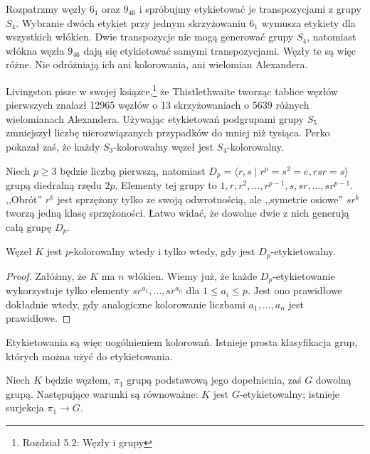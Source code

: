 Rozpatrzmy węzły $6_1$ oraz $9_{46}$ i spróbujmy etykietować je transpozycjami z grupy $S_4$.
Wybranie dwóch etykiet przy jednym skrzyżowaniu $6_1$ wymusza etykiety dla wszystkich włókien.
Dwie transpozycje nie mogą generować grupy $S_4$, natomiast włókna węzła $9_{46}$ dają się etykietować samymi transpozycjami.
Węzły te są więc różne.
Nie odróżniają ich ani kolorowania, ani wielomian Alexandera.

Livingston pisze w swojej książce,\footnote{Rozdział 5.2: Węzły i grupy} że Thistlethwaite tworząc tablice węzłów pierwszych znalazł 12965 węzłów o 13 skrzyżowaniach o 5639 różnych wielomianach Alexandera.
Używając etykietowań podgrupami grupy $S_5$ zmniejszył liczbę nierozwiązanych przypadków do mniej niż tysiąca.
Perko pokazał zaś, że każdy $S_3$-kolorowalny węzeł jest $S_4$-kolorowalny.

Niech $p \ge 3$ będzie liczbą pierwszą, natomiast $D_p = \langle r, s \mid r^p = s^2 = e, rsr = s \rangle$ grupą diedralną rzędu $2p$.
Elementy tej grupy to $1, r, r^2, \ldots, r^{p-1}, s, sr, \ldots, sr^{p-1}$.
,,Obrót'' $r^k$ jest sprzężony tylko ze swoją odwrotnością, ale ,,symetrie osiowe'' $sr^k$ tworzą jedną klasę sprzężoności.
Łatwo widać, że dowolne dwie z nich generują całą grupę $D_p$.

\begin{proposition}
	Węzeł $K$ jest $p$-kolorowalny wtedy i tylko wtedy, gdy jest $D_p$-etykietowalny.
\end{proposition}

\begin{proof}
	Załóżmy, że $K$ ma $n$ włókien.
	Wiemy już, że każde $D_p$-etykietowanie wykorzystuje tylko elementy $sr^{a_1}, \ldots, sr^{a_n}$ dla $1 \le a_i \le p$.
	Jest ono prawidłowe dokładnie wtedy, gdy analogiczne kolorowanie liczbami $a_1, \ldots, a_n$ jest prawidłowe.
\end{proof}

Etykietowania są więc uogólnieniem kolorowań.
Istnieje prosta klasyfikacja grup, których można użyć do etykietowania.

\begin{proposition}
	Niech $K$ będzie węzłem, $\pi_1$ grupą podstawową jego dopełnienia, zaś $G$ dowolną grupą.
	Następujące warunki są równoważne: $K$ jest $G$-etykietowalny; istnieje surjekcja $\pi_1 \to G$.
\end{proposition}



